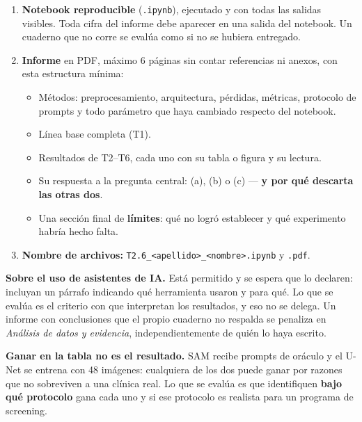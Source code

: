 \documentclass[11pt, a4paper]{article}
\begin{document}
\begin{entrega}
\begin{enumerate}[leftmargin=1.6em]
	\item \textbf{Notebook reproducible} (\texttt{.ipynb}), ejecutado y con todas las salidas visibles. Toda cifra del informe debe aparecer en una salida del notebook. Un cuaderno que no corre se eval\'ua como si no se hubiera entregado.
	\item \textbf{Informe} en PDF, m\'aximo 6 p\'aginas sin contar referencias ni anexos, con esta estructura m\'inima:
	\begin{itemize}
		\item M\'etodos: preprocesamiento, arquitectura, p\'erdidas, m\'etricas, protocolo de prompts y todo par\'ametro que haya cambiado respecto del notebook.
		\item L\'inea base completa (T1).
		\item Resultados de T2--T6, cada uno con su tabla o figura y su lectura.
		\item Su respuesta a la pregunta central: (a), (b) o (c) --- \textbf{y por qu\'e descarta las otras dos}.
		\item Una secci\'on final de \textbf{l\'imites}: qu\'e no logr\'o establecer y qu\'e experimento habr\'ia hecho falta.
	\end{itemize}
	\item \textbf{Nombre de archivos:} \texttt{T2.6\_<apellido>\_<nombre>.ipynb} y \texttt{.pdf}.
\end{enumerate}
\end{entrega}

\vspace{0.4em}
\noindent
\textbf{Sobre el uso de asistentes de IA.} Est\'a permitido y se espera que lo declaren: incluyan un p\'arrafo indicando qu\'e herramienta usaron y para qu\'e. Lo que se eval\'ua es el criterio con que interpretan los resultados, y eso no se delega. Un informe con conclusiones que el propio cuaderno no respalda se penaliza en \emph{An\'alisis de datos y evidencia}, independientemente de qui\'en lo haya escrito.

\begin{aviso}
\textbf{Ganar en la tabla no es el resultado.} SAM recibe prompts de or\'aculo y el U-Net se entrena con 48 im\'agenes: cualquiera de los dos puede ganar por razones que no sobreviven a una cl\'inica real. Lo que se eval\'ua es que identifiquen \textbf{bajo qu\'e protocolo} gana cada uno y si ese protocolo es realista para un programa de screening.
\end{aviso}
\end{document}
